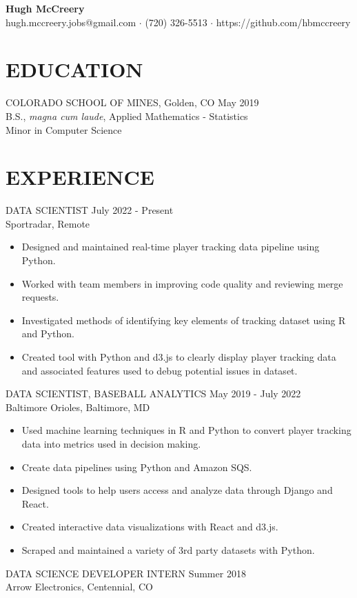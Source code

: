 \documentclass[11pt]{res} %
\begin{document}
 
	\begin{center}
 		\textbf{\LARGE Hugh McCreery} \\
 		hugh.mccreery.jobs@gmail.com $\cdot$ (720) 326-5513 $\cdot$ https://github.com/hbmccreery
	\end{center}
\vspace{-0.6in}
\begin{resume}
\hrulefill
\vspace{-0.2in}                                  
\section{EDUCATION} 
 \noindent COLORADO SCHOOL OF MINES, Golden, CO \hfill May 2019 \\
B.S., \textit{magna cum laude}, Applied Mathematics - Statistics\\
Minor in Computer Science \\
\vspace{-0.1in}
\hrulefill
\vspace{-0.1in}  
\section{EXPERIENCE} 
DATA SCIENTIST \hfill July 2022 - Present	\\
Sportradar, Remote

\begin{itemize}
	\item Designed and maintained real-time player tracking data pipeline using Python.
	\item Worked with team members in improving code quality and reviewing merge requests.
	\item Investigated methods of identifying key elements of tracking dataset using R and Python.
	\item Created tool with Python and d3.js to clearly display player tracking data and associated features used to debug potential issues in dataset.  
\end{itemize}
\vspace{-0.15in} 
DATA SCIENTIST, BASEBALL ANALYTICS \hfill May 2019  - July 2022	\\
Baltimore Orioles, Baltimore, MD

\begin{itemize}
	\item Used machine learning techniques in R and Python to convert player tracking data into metrics used in decision making.
	\item Create data pipelines using Python and Amazon SQS.
	\item Designed tools to help users access and analyze data through Django and React.
	\item Created interactive data visualizations with React and d3.js.
	\item Scraped and maintained a variety of 3rd party datasets with Python.
\end{itemize}
\vspace{-0.15in}  
DATA SCIENCE DEVELOPER INTERN \hfill Summer 2018 \\
Arrow Electronics, Centennial, CO


\end{resume}
\end{document}

